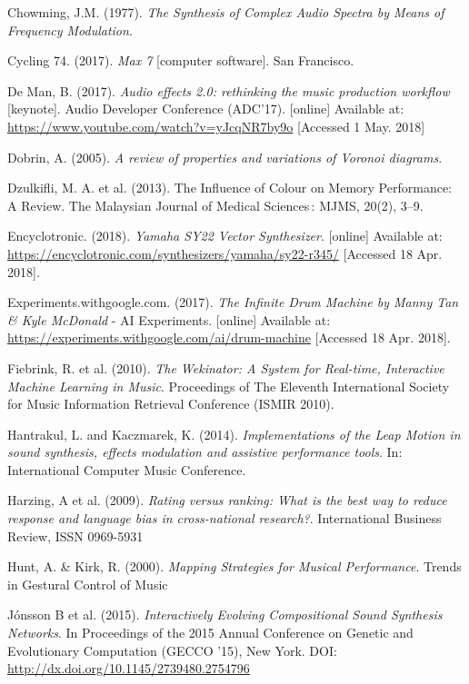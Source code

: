 \documentclass[11pt, oneside]{report}   	%
\begin{document}
{\begin{thebibliography}{9}
Chowming, J.M. (1977). \emph{The Synthesis of Complex Audio Spectra by Means of Frequency Modulation}.

Cycling 74. (2017). \emph{Max 7} [computer software]. San Francisco.

De Man, B. (2017). \emph{Audio effects 2.0: rethinking the music production workflow} [keynote]. Audio Developer Conference (ADC'17). [online] Available at: \url{https://www.youtube.com/watch?v=yJcqNR7by9o}  [Accessed 1  May. 2018]

Dobrin, A. (2005). \emph{A review of properties and variations of Voronoi diagrams}. 

Dzulkifli, M. A. et al. (2013). The Influence of Colour on Memory Performance: A Review. The Malaysian Journal of Medical Sciences : MJMS, 20(2), 3–9.

Encyclotronic. (2018). \emph{Yamaha SY22 Vector Synthesizer}. [online] Available at: \url{https://encyclotronic.com/synthesizers/yamaha/sy22-r345/} [Accessed 18 Apr. 2018].

Experiments.withgoogle.com. (2017). \emph{The Infinite Drum Machine by Manny Tan \& Kyle McDonald} - AI Experiments. [online] Available at: \url{https://experiments.withgoogle.com/ai/drum-machine} [Accessed 18 Apr. 2018].

Fiebrink, R. et al. (2010). \emph{The Wekinator: A System for Real-time, Interactive Machine Learning in Music}. Proceedings of The Eleventh International Society for Music Information Retrieval Conference (ISMIR 2010). 

Hantrakul, L. and Kaczmarek, K. (2014). \emph{Implementations of the Leap Motion in sound synthesis, effects modulation and assistive performance tools}. In: International Computer Music Conference. 

Harzing, A et al. (2009). \emph{Rating versus ranking: What is the best way to reduce response and language bias in cross-national research?}.
International Business Review,
ISSN 0969-5931

Hunt, A. \& Kirk, R. (2000). \emph{Mapping Strategies for Musical Performance}. Trends in Gestural Control of Music

J\'{o}nsson B et al. (2015). \emph{Interactively Evolving Compositional Sound Synthesis Networks}. In Proceedings of the 2015 Annual Conference on Genetic and Evolutionary Computation (GECCO '15), New York. DOI: \url{http://dx.doi.org/10.1145/2739480.2754796}


\end{thebibliography}}
\end{document}

